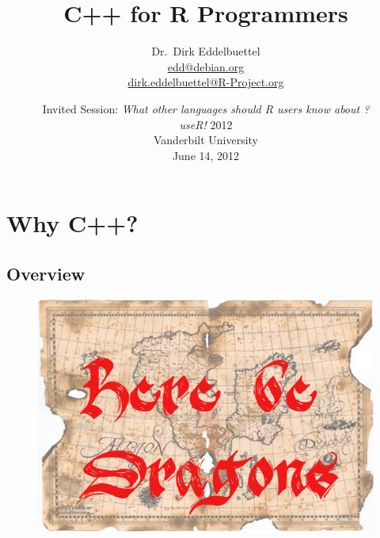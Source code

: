 \documentclass[dvipsnames,handout,compress,pdflatex,beamer]{beamer}
\title[C++ for R Programmers]{C++ for R Programmers}
\author[Dirk Eddelbuettel]{Dr.~Dirk Eddelbuettel\\ \scriptsize\url{edd@debian.org}\\ \url{dirk.eddelbuettel@R-Project.org}}
\date[useR! 2012 @ Vanderbilt]{
  { \small 
    Invited Session: 
    \textsl{What other languages should R users know about ?}}\\[20pt] 
  \textsl{useR!} 2012\\ Vanderbilt University \\
  June 14, 2012  }
\begin{document}



\section[C++?]{Why C++?}

\subsection{Overview}

\begin{frame}

  \begin{figure}
    \includegraphics[scale=0.55]{images/there-be-dragons-map.jpg}
  \end{figure}

\end{frame}
\end{document}
